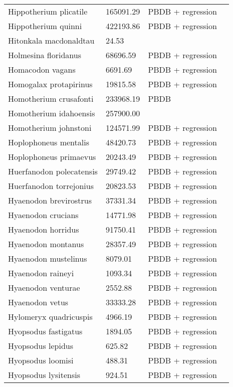 \documentclass{article}
\begin{document}
\begin{center}
\begin{longtable}{p{} p{} p{} p{}}
    Hippotherium plicatile & 165091.29 & PBDB + regression &  \\ 
    Hippotherium quinni & 422193.86 & PBDB + regression &  \\ 
    Hitonkala macdonaldtau & 24.53 & \cite{Tomiya2013} &  \\ 
    Holmesina floridanus & 68696.59 & PBDB + regression &  \\ 
    Homacodon vagans & 6691.69 & PBDB + regression &  \\ 
    Homogalax protapirinus & 19815.58 & PBDB + regression &  \\ 
    Homotherium crusafonti & 233968.19 & PBDB &  \\ 
    Homotherium idahoensis & 257900.00 & \cite{McKenna2011} &  \\ 
    Homotherium johnstoni & 124571.99 & PBDB + regression &  \\ 
    Hoplophoneus mentalis & 48420.73 & PBDB + regression &  \\ 
    Hoplophoneus primaevus & 20243.49 & PBDB + regression &  \\ 
    Huerfanodon polecatensis & 29749.42 & PBDB + regression &  \\ 
    Huerfanodon torrejonius & 20823.53 & PBDB + regression &  \\ 
    Hyaenodon brevirostrus & 37331.34 & PBDB + regression &  \\ 
    Hyaenodon crucians & 14771.98 & PBDB + regression &  \\ 
    Hyaenodon horridus & 91750.41 & PBDB + regression &  \\ 
    Hyaenodon montanus & 28357.49 & PBDB + regression &  \\ 
    Hyaenodon mustelinus & 8079.01 & PBDB + regression &  \\ 
    Hyaenodon raineyi & 1093.34 & PBDB + regression &  \\ 
    Hyaenodon venturae & 2552.88 & PBDB + regression &  \\ 
    Hyaenodon vetus & 33333.28 & PBDB + regression &  \\ 
    Hylomeryx quadricuspis & 4966.19 & PBDB + regression &  \\ 
    Hyopsodus fastigatus & 1894.05 & PBDB + regression &  \\ 
    Hyopsodus lepidus & 625.82 & PBDB + regression &  \\ 
    Hyopsodus loomisi & 488.31 & PBDB + regression &  \\ 
    Hyopsodus lysitensis & 924.51 & PBDB + regression &  \\ 

\end{longtable}
\end{center}
\end{document}
